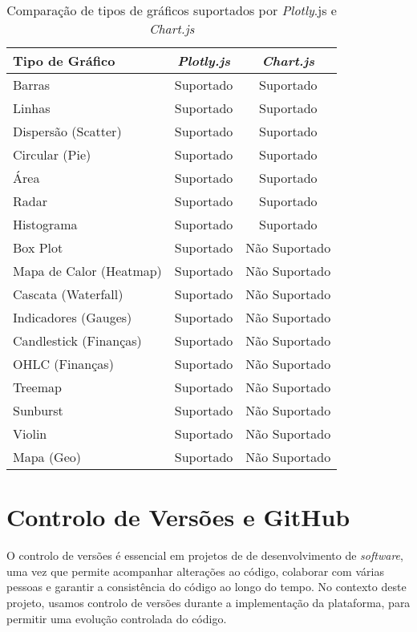 \begin{table}[H]
\centering
\caption{Comparação de tipos de gráficos suportados por \textit{Plotly}.js e \textit{Chart.js}}
\begin{tabular}{|l|c|c|}
\hline
\textbf{Tipo de Gráfico} & \textbf{\textit{Plotly.js}} & \textbf{\textit{Chart.js}} \\
\hline
Barras                         & Suportado & Suportado \\
Linhas                         & Suportado & Suportado \\
Dispersão (Scatter)            & Suportado & Suportado \\
Circular (Pie)                 & Suportado & Suportado \\
Área                           & Suportado & Suportado \\
Radar                          & Suportado & Suportado \\
Histograma                     & Suportado & Suportado \\
Box Plot                       & Suportado & Não Suportado \\
Mapa de Calor (Heatmap)        & Suportado & Não Suportado \\
Cascata (Waterfall)            & Suportado & Não Suportado \\
Indicadores (Gauges)           & Suportado & Não Suportado \\
Candlestick (Finanças)         & Suportado & Não Suportado \\
OHLC (Finanças)                & Suportado & Não Suportado \\
Treemap                        & Suportado & Não Suportado \\
Sunburst                       & Suportado & Não Suportado \\
Violin                         & Suportado & Não Suportado \\
Mapa (Geo)                     & Suportado & Não Suportado \\
\hline
\end{tabular}
\label{tab:charts}
\end{table}

\chapter{Controlo de Versões e GitHub}

O controlo de versões é essencial em projetos de de desenvolvimento de \textit{software}, uma vez que permite acompanhar alterações ao código, colaborar com várias pessoas e garantir a consistência do código ao longo do tempo. No contexto deste projeto, usamos controlo de versões durante a implementação da plataforma, para permitir uma evolução controlada do código.

